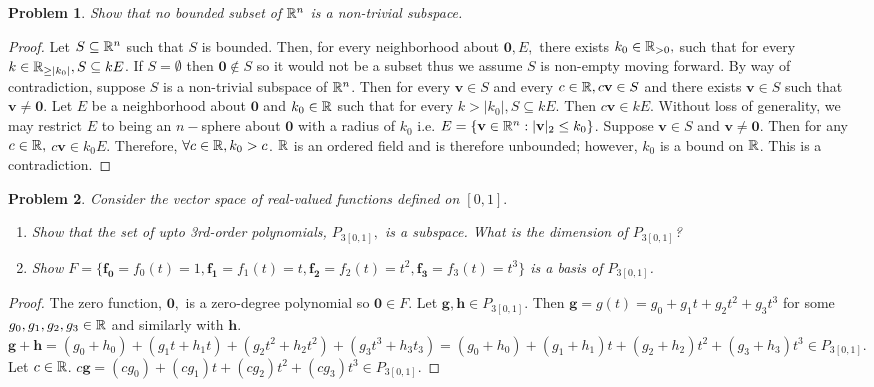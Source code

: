 \documentclass[12pt,oneside]{amsart}
\numberwithin{equation}{section}
\numberwithin{figure}{section}
\theoremstyle{plain}
\newtheorem{prob}{Problem}
\theoremstyle{definition}
\newcommand{\R}{\ensuremath \mathbb{R}}
\begin{document}
\begin{prob}
Show that no bounded subset of $\R^n$ is a non-trivial subspace.
\end{prob}
\begin{proof}
  Let $S \subseteq \R^n$ such that $S$ is bounded. Then, for every neighborhood 
  about $\mathbf{0}, E,$ there exists $k_0 \in \R_{>0},$ such that for every $k \in 
  \R_{\geq |k_0|}, S \subseteq kE$. If $S = \emptyset$ then $\mathbf{0} \not \in 
  S$ so it would not be a subset thus we assume $S$ is non-empty moving forward. 
  By way of contradiction, suppose $S$ is a non-trivial subspace of $\R^n$. Then 
  for every $\mathbf{v} \in S$ and every $c \in \R, c\mathbf{v} \in S$ and there 
  exists $\mathbf{v} \in S$ such that $\mathbf{v} \neq \mathbf{0}$. Let $E$ be a 
  neighborhood about $\mathbf{0}$ and $k_0 \in \R$ such that for every $k > 
  |k_0|, S \subseteq kE$. Then $c\mathbf{v} \in kE$. Without loss of generality, 
  we may restrict $E$ to being an $n-$sphere about $\mathbf{0}$ with a radius of 
  $k_0$ i.e. $E = \{\mathbf{v} \in \R^n : |\mathbf{v}|_2 \leq k_0\}$. Suppose 
  $\mathbf{v} \in S$ and $\mathbf{v} \neq \mathbf{0}$. Then for any $c \in \R,$ 
  $c\mathbf{v} \in k_0E$. Therefore, $\forall c \in \R, k_0 > c$. $\R$ is an 
  ordered field and is therefore unbounded; however, $k_0$ is a bound on $\R$. 
  This is a contradiction.
\end{proof}

\begin{prob}
  Consider the vector space of real-valued functions defined on $[0,1].$
  \begin{enumerate}
    \item Show that the set of upto 3rd-order polynomials, $P_{3[0,1]},$ is a 
      subspace. What is the dimension of $P_{3[0,1]}$?
    \item Show $F = \{\mathbf{f_0} = f_0(t) = 1, \mathbf{f_1} = f_1(t) = t, 
      \mathbf{f_2} = f_2(t) = t^2, \mathbf{f_3} = f_3(t) = t^3\}$ is a 
      basis of $P_{3[0,1]}$.
  \end{enumerate}
\end{prob}
\begin{proof}
  The zero function, $\mathbf{0},$ is a zero-degree polynomial so $\mathbf{0} \in 
  F$. Let $\mathbf{g},\mathbf{h} \in P_{3[0,1]}$. Then $\mathbf{g} = g(t) = g_0 + 
  g_1t + g_2t^2 + g_3t^3$ for some $g_0,g_1,g_2,g_3 \in \R$ and similarly with 
  $\mathbf{h}$. $\mathbf{g} + \mathbf{h} = (g_0 + h_0) + (g_1t + h_1t) + 
  (g_2t^2 + h_2t^2) + (g_3t^3 + h_3t_3) = (g_0 + h_0) + (g_1 + h_1)t + 
  (g_2 + h_2)t^2 + (g_3 + h_3)t^3 \in P_{3[0,1]}$. Let $c \in \R$. $c\mathbf{g} = 
  (cg_0) + (cg_1)t + (cg_2)t^2 + (cg_3)t^3 \in P_{3[0,1]}$.
\end{proof}
\end{document}
